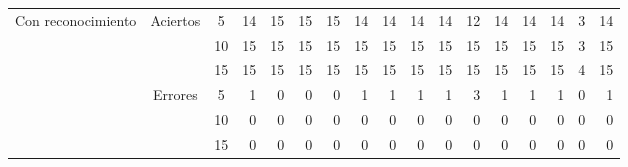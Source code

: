 \begin{sidewaystable}
\begin{tabular}{@{}ccc|rrrrrrrrrrrrrr@{}}
\multirow{6}{*}{Con reconocimiento}   & \multirow{3}{*}{Aciertos}  & 5                    & 14                     & 15                     & 15                     & 15                     & 14                     & 14                     & 14                     & 14                     & 12                     & 14                     & 14                     & 14                     & 3                      & 14                     \\
                                      &                            & 10                   & 15                     & 15                     & 15                     & 15                     & 15                     & 15                     & 15                     & 15                     & 15                     & 15                     & 15                     & 15                     & 3                      & 15                     \\
                                      &                            & 15                   & 15                     & 15                     & 15                     & 15                     & 15                     & 15                     & 15                     & 15                     & 15                     & 15                     & 15                     & 15                     & 4                      & 15                     \\ \cmidrule{2-17}
                                      & \multirow{3}{*}{Errores}   & 5                    & 1                      & 0                      & 0                      & 0                      & 1                      & 1                      & 1                      & 1                      & 3                      & 1                      & 1                      & 1                      & 0                      & 1                      \\
                                      &                            & 10                   & 0                      & 0                      & 0                      & 0                      & 0                      & 0                      & 0                      & 0                      & 0                      & 0                      & 0                      & 0                      & 0                      & 0                      \\
                                      &                            & 15                   & 0                      & 0                      & 0                      & 0                      & 0                      & 0                      & 0                      & 0                      & 0                      & 0                      & 0                      & 0                      & 0                      & 0                      \\

\end{tabular}
\end{sidewaystable}
